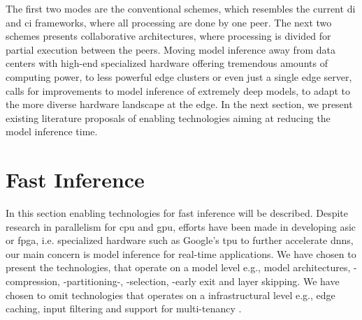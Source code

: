 The first two modes are the conventional schemes, which resembles the current \gls{di} and \gls{ci} frameworks, where all processing are done by one peer. The next two schemes presents collaborative architectures, where processing is divided for partial execution between the peers.
Moving model inference away from data centers with high-end specialized hardware offering tremendous amounts of computing power, to less powerful edge clusters or even just a single edge server, calls for improvements to model inference of extremely deep models, to adapt to the more diverse hardware landscape at the edge. In the next section, we present existing literature proposals of enabling technologies aiming at reducing the model inference time.

\section{Fast Inference} \label{sec:ei-fast-inference}

In this section enabling technologies for fast inference will be described. Despite research in parallelism for \gls{cpu} and \gls{gpu}, efforts have been made in developing \gls{asic} or \gls{fpga}, i.e. specialized hardware such as Google's \gls{tpu} to further accelerate \gls{dnn}s, our main concern is model inference for real-time applications. We have chosen to present the technologies, that operate on a model level e.g., model architectures, -compression, -partitioning-, -selection, -early exit and layer skipping. We have chosen to omit technologies that operates on a infrastructural level e.g., edge caching, input filtering and support for multi-tenancy \cite{zhou_edge_2019}.

